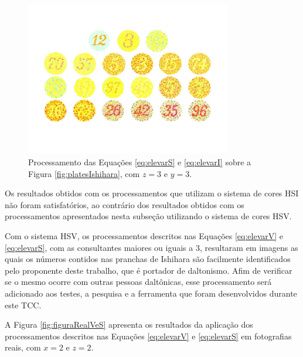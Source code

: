 \documentclass[	12pt, Times, openright, twoside, a4paper, english, brazil]{abntex2}
\begin{document}
\begin{figure}[!htb]
\centering \includegraphics[width=0.80\textwidth]{figuraElevarSeI.jpg}
\caption{Processamento das Equações \ref{eq:elevarS} e \ref{eq:elevarI} sobre a Figura \ref{fig:platesIshihara}, com $z = 3$ e $y = 3$. \label{fig:figuraElevarSeI}}
\end{figure}

Os resultados obtidos com os processamentos que utilizam o sistema de cores HSI não foram satisfatórios, ao contrário dos resultados obtidos com os processamentos apresentados nesta subseção utilizando o sistema de cores HSV.

Com o sistema HSV, os processamentos descritos nas Equações \ref{eq:elevarV} e \ref{eq:elevarS}, com as consultantes maiores ou iguais a 3, resultaram em imagens as quais os números contidos nas pranchas de Ishihara são facilmente identificados pelo proponente deste trabalho, que é portador de daltonismo. Afim de verificar se o mesmo ocorre com outras pessoas daltônicas, esse processamento será adicionado aos testes, a pesquisa e a ferramenta que foram desenvolvidos durante este TCC.

A Figura \ref{fig:figuraRealVeS} apresenta os resultados da aplicação dos processamentos descritos nas Equações \ref{eq:elevarV} e \ref{eq:elevarS} em fotografias reais, com $x = 2$ e $z = 2$.
\end{document}
